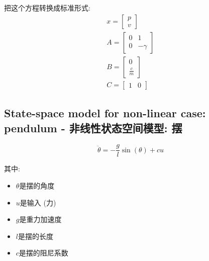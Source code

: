 把这个方程转换成标准形式:
\begin{equation}
    \begin{aligned}
        x = \begin{bmatrix} p \\ v \end{bmatrix} \\
        A = \begin{bmatrix} 0 & 1 \\ 0 & -\gamma \end{bmatrix} \\
        B = \begin{bmatrix} 0 \\ \frac{c}{m} \end{bmatrix} \\
        C = \begin{bmatrix} 1 & 0 \end{bmatrix}
    \end{aligned}
\end{equation}

\subsection{State-space model for non-linear case: pendulum - 非线性状态空间模型: 摆}

\begin{equation}
    \ddot{\theta} = -\frac{g}{l} \sin(\theta) + cu
\end{equation}

其中:
\begin{itemize}
    \item $\theta$是摆的角度
    \item $u$是输入 (力)
    \item $g$是重力加速度
    \item $l$是摆的长度
    \item $c$是摆的阻尼系数
\end{itemize}


